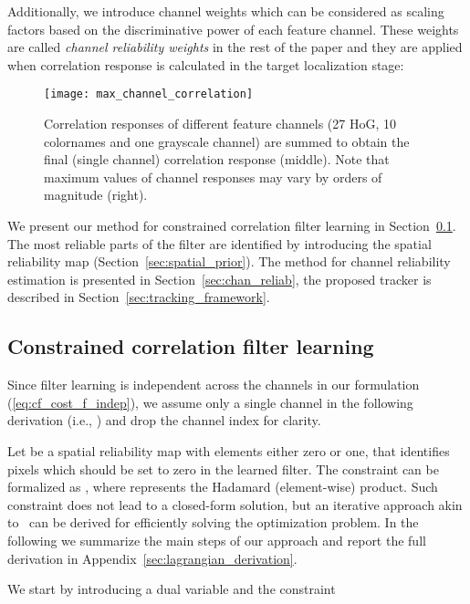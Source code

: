 \documentclass[twocolumn]{article}
\begin{document}
Additionally, we introduce channel weights  which can be considered as scaling factors based on the discriminative power of each feature channel. These weights are called {\it channel reliability weights} in the rest of the paper and they are applied when correlation response is calculated in the target localization stage:


\begin{figure}[!t]
\centering
\texttt{[image: max\_channel\_correlation]}
\caption{Correlation responses of different feature channels (27 HoG, 10 colornames and one grayscale channel) are summed to obtain the final (single channel) correlation response (middle). Note that maximum values of channel responses may vary by orders of magnitude (right).}
\label{fig:max_channels}
\end{figure}

We present our method for constrained correlation filter learning in Section~\ref{sec:constrained_learning}. The most reliable parts of the filter are identified by introducing the spatial reliability map (Section~\ref{sec:spatial_prior}). The method for channel reliability  estimation is presented in Section~\ref{sec:chan_reliab}, the proposed tracker is described in Section~\ref{sec:tracking_framework}.

\subsection{Constrained correlation filter learning} \label{sec:constrained_learning}

Since filter learning is independent across the channels in our formulation (\ref{eq:cf_cost_f_indep}), we assume only a single channel in the following derivation (i.e., ) and drop the channel index for clarity.



Let  be a spatial reliability map with elements either zero or one, that identifies pixels which should be set to zero in the learned filter. The constraint can be formalized as , where  represents the Hadamard (element-wise) product. Such constraint does not lead to a closed-form solution, but an iterative approach akin to~\cite{cfwlb_cvpr2015} can be derived for efficiently solving the optimization problem. In the following we summarize the main steps of our approach and report the full derivation in Appendix~\ref{sec:lagrangian_derivation}.



We start by introducing a dual variable  and the constraint 
\end{document}
